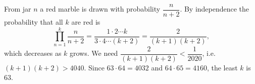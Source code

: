 From jar $n$ a red marble is drawn with probability $\dfrac{n}{n+2}$. By independence the probability that all $k$ are red is
\[\prod_{n=1}^{k}\dfrac{n}{n+2}=\dfrac{1\cdot2\cdots k}{3\cdot4\cdots(k+2)}=\dfrac{2}{(k+1)(k+2)},\]
which decreases as $k$ grows. We need $\dfrac{2}{(k+1)(k+2)}<\dfrac{1}{2020}$, i.e. $(k+1)(k+2)>4040$. Since $63\cdot64=4032$ and $64\cdot65=4160$, the least $k$ is $\boxed{63}$.
